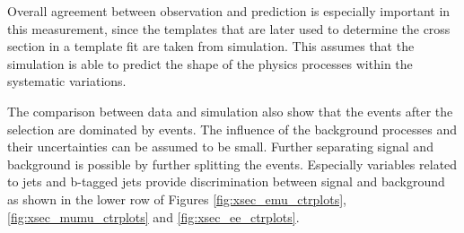 Overall agreement between observation and prediction is especially important in this measurement, since the templates that are later used to determine the cross section in a template fit are taken from simulation.
This assumes that the simulation is able to predict the shape of the physics processes within the systematic variations.

The comparison between data and simulation also show that the events after the selection are dominated by \ttbar events. The influence of the background processes and their uncertainties can be assumed to be small.
Further separating signal and background is possible by further splitting the events. Especially variables related to jets and b-tagged jets provide discrimination between signal and background as shown in the lower row of Figures 
\ref{fig:xsec_emu_ctrplots},\ref{fig:xsec_mumu_ctrplots} and \ref{fig:xsec_ee_ctrplots}.


